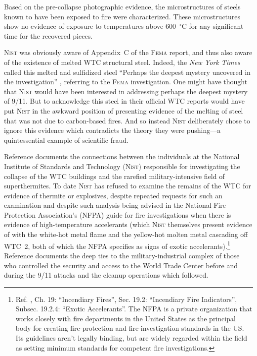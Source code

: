 \documentclass[letterpaper,12pt]{article}
\newenvironment{squote}
  {\small\quote}
  {\endquote\normalsize}
\begin{document}
\begin{squote}
Based on the pre-collapse photographic evidence, the microstructures of steels known to have been exposed to fire were characterized. These microstructures show no evidence of exposure to temperatures above 600~\( ^{\circ}\text{C} \) for any significant time for the recovered pieces.
\end{squote}

\textsc{Nist} was obviously aware of Appendix~C of the \textsc{Fema} report, and thus also aware of the existence of melted WTC structural steel. Indeed, the \emph{New York Times} called this melted and sulfidized steel ``Perhaps the deepest mystery uncovered in the investigation'' \cite{GlanzLipton2002}, referring to the \textsc{Fema} investigation. One might have thought that \textsc{Nist} would have been interested in addressing perhaps the deepest mystery of 9/11. But to acknowledge this steel in their official WTC reports would have put \textsc{Nist} in the awkward position of presenting evidence of the melting of steel that was not due to carbon-based fires. And so instead \textsc{Nist} deliberately chose to ignore this evidence which contradicts the theory they were pushing---a quintessential example of scientific fraud.

Reference  documents the connections between the individuals at the National Institute of Standards and Technology (\textsc{Nist}) responsible for investigating the collapse of the WTC buildings and the rarefied military-intensive field of superthermites. To date \textsc{Nist} has refused to examine the remains of the WTC for evidence of thermite or explosives, despite repeated requests for such an examination and despite such analysis being advised in the National Fire Protection Association's (NFPA) guide for fire investigations when there is evidence of high-temperature accelerants (which \textsc{Nist} themselves present evidence of with the white-hot metal flame and the yellow-hot molten metal cascading off WTC~2, both of which the NFPA specifies as signs of exotic accelerants).\footnote{Ref. , Ch. 19: ``Incendiary Fires'', Sec. 19.2: ``Incendiary Fire Indicators'', Subsec. 19.2.4: ``Exotic Accelerants''. The NFPA is a private organization that works closely with fire departments in the United States as the principal body for creating fire-protection and fire-investigation standards in the US. Its guidelines aren't legally binding, but are widely regarded within the field as setting minimum standards for competent fire investigations.} Reference  documents the deep ties to the military-industrial complex of those who controlled the security and access to the World Trade Center before and during the 9/11 attacks and the cleanup operations which followed.
\end{document}
